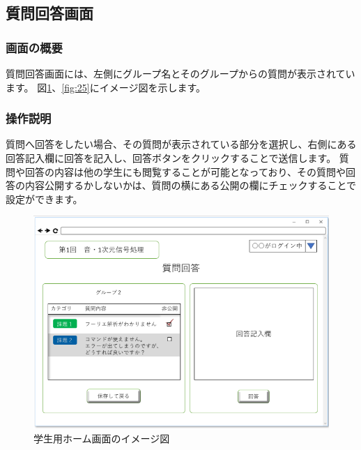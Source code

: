 \subsection{質問回答画面}
\subsubsection{画面の概要}
質問回答画面には、左側にグループ名とそのグループからの質問が表示されています。
図\ref{fig:24}、\ref{fig:25}にイメージ図を示します。

\subsubsection{操作説明}
質問へ回答をしたい場合、その質問が表示されている部分を選択し、右側にある回答記入欄に回答を記入し、回答ボタンをクリックすることで送信します。
質問や回答の内容は他の学生にも閲覧することが可能となっており、その質問や回答の内容公開するかしないかは、質問の横にある公開の欄にチェックすることで設定ができます。

\begin{figure}[phtbp]
  \begin{center}
    \includegraphics[width=1\linewidth,clip]{./img/24.png}
    \caption{学生用ホーム画面のイメージ図}\label{fig:24}
  \end{center}
\end{figure}

